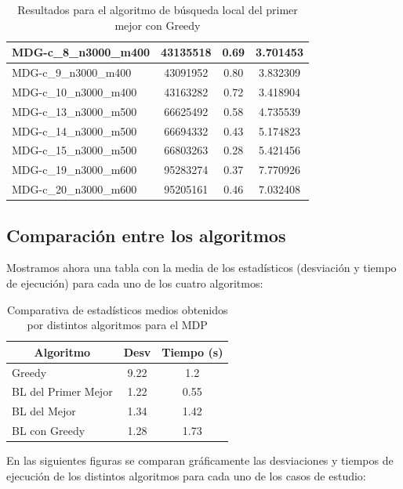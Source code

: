 \documentclass[11pt,a4paper]{article}
\begin{document}
\begin{table}[H]
\begin{center}
\begin{tabular}{|l|c|c|c|}
			MDG-c\_8\_n3000\_m400 & 43135518 & 0.69 & 3.701453 \\ \hline
			MDG-c\_9\_n3000\_m400 & 43091952 & 0.80 & 3.832309 \\ \hline
			MDG-c\_10\_n3000\_m400 & 43163282 & 0.72 & 3.418904 \\ \hline
			MDG-c\_13\_n3000\_m500 & 66625492 & 0.58 & 4.735539 \\ \hline
			MDG-c\_14\_n3000\_m500 & 66694332 & 0.43 & 5.174823 \\ \hline
			MDG-c\_15\_n3000\_m500 & 66803263 & 0.28 & 5.421456 \\ \hline
			MDG-c\_19\_n3000\_m600 & 95283274 & 0.37 & 7.770926 \\ \hline
			MDG-c\_20\_n3000\_m600 & 95205161 & 0.46 & 7.032408 \\ \hline
		\end{tabular}
	\end{center}
	\caption{Resultados para el algoritmo de búsqueda local del primer mejor con Greedy}
	\label{}
\end{table}

\subsection{Comparación entre los algoritmos}
Mostramos ahora una tabla con la media de los estadísticos (desviación  y tiempo de ejecución) para cada uno de los cuatro algoritmos:
\begin{table}[H]
	\begin{center}
		\begin{tabular}{|l|c|c|}
			\hline
			\multicolumn{1}{|c|}{\textbf{Algoritmo}} & \textbf{Desv} & \textbf{Tiempo (s)} \\ \hline
			Greedy & 9.22 & 1.2 \\ \hline
			BL del Primer Mejor & 1.22 & 0.55 \\ \hline
			BL del Mejor & 1.34 & 1.42 \\ \hline
			BL con Greedy & 1.28 & 1.73 \\ \hline
		\end{tabular}
	\end{center}
	\caption{Comparativa de estadísticos medios obtenidos por distintos algoritmos para el MDP}
	\label{}
\end{table}

En las siguientes figuras se comparan gráficamente las desviaciones y tiempos de ejecución de los distintos algoritmos para cada uno de los casos de estudio:
\end{document}

